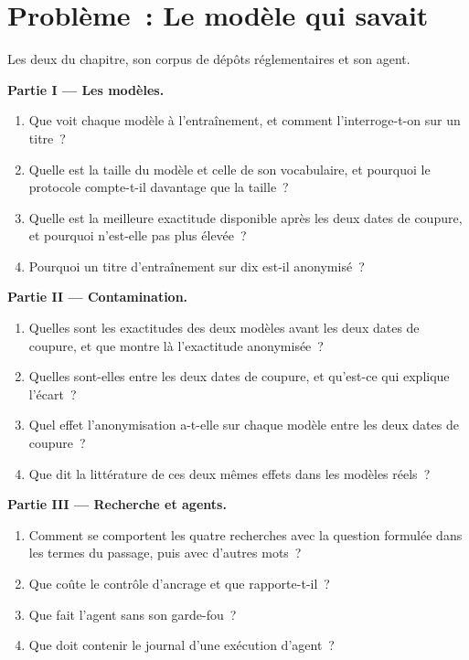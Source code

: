 \section{Problème~: Le modèle qui savait}

\begin{problem}\label{pb:ml:large-language-models-in-finance:1}
Les deux  du chapitre, son corpus de dépôts réglementaires et son agent.

\medskip\noindent\textbf{Partie I --- Les modèles.}
\begin{enumerate}
\item Que voit chaque modèle à l'entraînement, et comment l'interroge-t-on sur un titre~?
\item Quelle est la taille du modèle et celle de son vocabulaire, et pourquoi le protocole compte-t-il davantage que la taille~?
\item Quelle est la meilleure exactitude disponible après les deux dates de coupure, et pourquoi n'est-elle pas plus élevée~?
\item Pourquoi un titre d'entraînement sur dix est-il anonymisé~?
\end{enumerate}

\medskip\noindent\textbf{Partie II --- Contamination.}
\begin{enumerate}[resume]
\item Quelles sont les exactitudes des deux modèles avant les deux dates de coupure, et que montre là l'exactitude anonymisée~?
\item Quelles sont-elles entre les deux dates de coupure, et qu'est-ce qui explique l'écart~?
\item Quel effet l'anonymisation a-t-elle sur chaque modèle entre les deux dates de coupure~?
\item Que dit la littérature de ces deux mêmes effets dans les modèles réels~?
\end{enumerate}

\medskip\noindent\textbf{Partie III --- Recherche et agents.}
\begin{enumerate}[resume]
\item Comment se comportent les quatre recherches avec la question formulée dans les termes du passage, puis avec d'autres mots~?
\item Que coûte le contrôle d'ancrage et que rapporte-t-il~?
\item Que fait l'agent sans son garde-fou~?
\item Que doit contenir le journal d'une exécution d'agent~?
\end{enumerate}


\end{problem}
